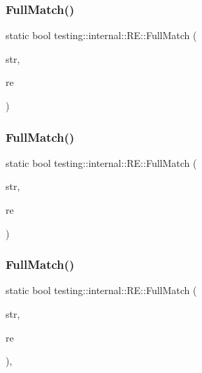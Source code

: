 \subsubsection{\texorpdfstring{FullMatch()}{FullMatch()}\hspace{0.1cm}{\footnotesize\ttfamily [3/6]}}
{\footnotesize\ttfamily static bool testing\+::internal\+::\+R\+E\+::\+Full\+Match (\begin{DoxyParamCaption}\item[{const char $\ast$}]{str,  }\item[{const \mbox{\hyperlink{classtesting_1_1internal_1_1_r_e}{RE}} \&}]{re }\end{DoxyParamCaption})\hspace{0.3cm}{\ttfamily [static]}}

\mbox{\label{classtesting_1_1internal_1_1_r_e_a2b13ec1f6ccd6c32f7efa01e21588f0b}} 
\subsubsection{\texorpdfstring{FullMatch()}{FullMatch()}\hspace{0.1cm}{\footnotesize\ttfamily [4/6]}}
{\footnotesize\ttfamily static bool testing\+::internal\+::\+R\+E\+::\+Full\+Match (\begin{DoxyParamCaption}\item[{const char $\ast$}]{str,  }\item[{const \mbox{\hyperlink{classtesting_1_1internal_1_1_r_e}{RE}} \&}]{re }\end{DoxyParamCaption})\hspace{0.3cm}{\ttfamily [static]}}

\mbox{\label{classtesting_1_1internal_1_1_r_e_aa79a950758d0f1d62f7762d1e9cefe86}} 
\subsubsection{\texorpdfstring{FullMatch()}{FullMatch()}\hspace{0.1cm}{\footnotesize\ttfamily [5/6]}}
{\footnotesize\ttfamily static bool testing\+::internal\+::\+R\+E\+::\+Full\+Match (\begin{DoxyParamCaption}\item[{const \+::std\+::string \&}]{str,  }\item[{const \mbox{\hyperlink{classtesting_1_1internal_1_1_r_e}{RE}} \&}]{re }\end{DoxyParamCaption})\hspace{0.3cm}{\ttfamily [inline]}, {\ttfamily [static]}}


